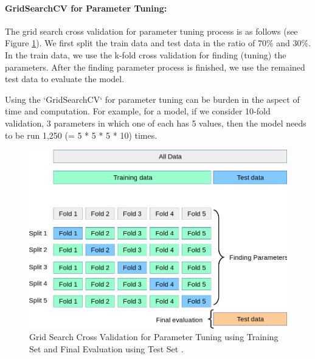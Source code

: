\documentclass[11pt]{article}
\begin{document}
\paragraph*{GridSearchCV for Parameter Tuning:}
The grid search cross validation for parameter tuning process is as follows (see Figure \ref{fig:grid_search_cross_validation}). We first split the train data and test data in the ratio of 70\% and 30\%. In the train data, we use the k-fold cross validation for finding (tuning) the parameters. After the finding parameter process is finished, we use the remained test data to evaluate the model.

Using the `GridSearchCV` for parameter tuning can be burden in the aspect of time and computation.
%
For example, for a model, if we consider 10-fold validation, 3 parameters in which one of each has 5 values, then the model needs to be run 1,250 (= 5 * 5 * 5 * 10) times.
%

\begin{figure}[h]
\centering 
\includegraphics[width=\linewidth]{grid_search_cross_validation.png}
\caption{Grid Search Cross Validation for Parameter Tuning using Training Set and Final Evaluation using Test Set \cite{gridsearchcv}.}
  \label{fig:grid_search_cross_validation}
\end{figure}
\end{document}
